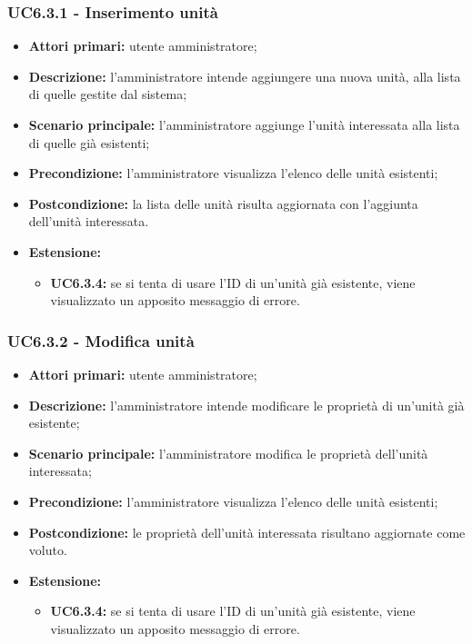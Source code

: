 \subsubsection{UC6.3.1 - Inserimento unità}
	\begin{itemize}
		\item \textbf{Attori primari:} utente amministratore;
		\item \textbf{Descrizione:} l'amministratore intende aggiungere una nuova unità, alla lista di quelle gestite dal sistema;
		\item \textbf{Scenario principale:} l'amministratore aggiunge l'unità interessata alla lista di quelle già esistenti;
		\item \textbf{Precondizione:} l'amministratore visualizza l'elenco delle unità esistenti;
		\item \textbf{Postcondizione:} la lista delle unità risulta aggiornata con l'aggiunta dell'unità interessata.
		\item \textbf{Estensione:}
		\begin{itemize}
			\item \textbf{UC6.3.4:} se si tenta di usare l'ID di un'unità già esistente, viene visualizzato un apposito messaggio di errore.
		\end{itemize}
	\end{itemize}

\subsubsection{UC6.3.2 - Modifica unità}
	\begin{itemize}
		\item \textbf{Attori primari:} utente amministratore;
		\item \textbf{Descrizione:} l'amministratore intende modificare le proprietà di un'unità già esistente;
		\item \textbf{Scenario principale:} l'amministratore modifica le proprietà dell'unità interessata;
		\item \textbf{Precondizione:} l'amministratore visualizza l'elenco delle unità esistenti;
		\item \textbf{Postcondizione:} le proprietà dell'unità interessata risultano aggiornate come voluto.
		\item \textbf{Estensione:}
		\begin{itemize}
			\item \textbf{UC6.3.4:} se si tenta di usare l'ID di un'unità già esistente, viene visualizzato un apposito messaggio di errore.
		\end{itemize}
	\end{itemize}

